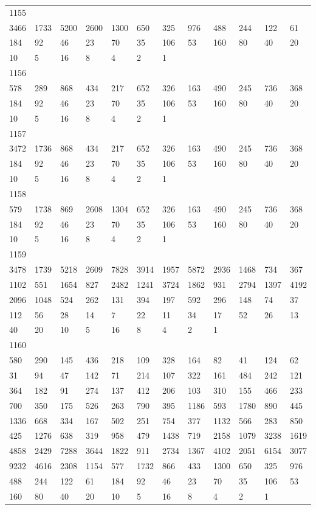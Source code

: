 \begin{longtable}{llllllllllll}
1155&&&&&&&&&&&\\
3466& 1733& 5200& 2600& 1300& 650& 325& 976& 488& 244& 122& 61\\
184& 92& 46& 23& 70& 35& 106& 53& 160& 80& 40& 20\\
10& 5& 16& 8& 4& 2& 1& \\

1156&&&&&&&&&&&\\
578& 289& 868& 434& 217& 652& 326& 163& 490& 245& 736& 368\\
184& 92& 46& 23& 70& 35& 106& 53& 160& 80& 40& 20\\
10& 5& 16& 8& 4& 2& 1& \\

1157&&&&&&&&&&&\\
3472& 1736& 868& 434& 217& 652& 326& 163& 490& 245& 736& 368\\
184& 92& 46& 23& 70& 35& 106& 53& 160& 80& 40& 20\\
10& 5& 16& 8& 4& 2& 1& \\

1158&&&&&&&&&&&\\
579& 1738& 869& 2608& 1304& 652& 326& 163& 490& 245& 736& 368\\
184& 92& 46& 23& 70& 35& 106& 53& 160& 80& 40& 20\\
10& 5& 16& 8& 4& 2& 1& \\

1159&&&&&&&&&&&\\
3478& 1739& 5218& 2609& 7828& 3914& 1957& 5872& 2936& 1468& 734& 367\\
1102& 551& 1654& 827& 2482& 1241& 3724& 1862& 931& 2794& 1397& 4192\\
2096& 1048& 524& 262& 131& 394& 197& 592& 296& 148& 74& 37\\
112& 56& 28& 14& 7& 22& 11& 34& 17& 52& 26& 13\\
40& 20& 10& 5& 16& 8& 4& 2& 1& \\

1160&&&&&&&&&&&\\
580& 290& 145& 436& 218& 109& 328& 164& 82& 41& 124& 62\\
31& 94& 47& 142& 71& 214& 107& 322& 161& 484& 242& 121\\
364& 182& 91& 274& 137& 412& 206& 103& 310& 155& 466& 233\\
700& 350& 175& 526& 263& 790& 395& 1186& 593& 1780& 890& 445\\
1336& 668& 334& 167& 502& 251& 754& 377& 1132& 566& 283& 850\\
425& 1276& 638& 319& 958& 479& 1438& 719& 2158& 1079& 3238& 1619\\
4858& 2429& 7288& 3644& 1822& 911& 2734& 1367& 4102& 2051& 6154& 3077\\
9232& 4616& 2308& 1154& 577& 1732& 866& 433& 1300& 650& 325& 976\\
488& 244& 122& 61& 184& 92& 46& 23& 70& 35& 106& 53\\
160& 80& 40& 20& 10& 5& 16& 8& 4& 2& 1& \\


\end{longtable}
